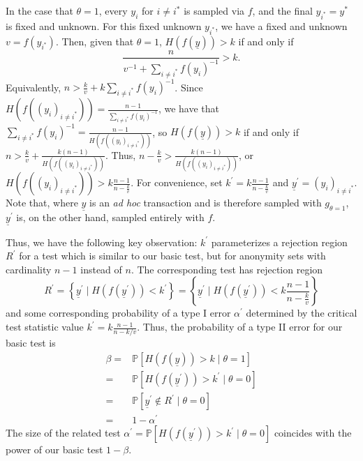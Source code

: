 \documentclass{tran-l}
\theoremstyle{cor}
\theoremstyle{definition}
\theoremstyle{remark}
\theoremstyle{conjecture}
\numberwithin{equation}{section}
\begin{document}
In the case that $\theta = 1$, every $y_i$ for $i \neq i^*$ is sampled via $f$, and the final $y_{i^*} = y^*$ is fixed and unknown. For this fixed unknown $y_{i^*}$, we have a fixed and unknown $v = f(y_{i^*})$. Then, given that $\theta=1$, $H(f(\underline{y})) > k$ if and only if \[\frac{n}{v^{-1} + \sum_{i \neq i^*} f(y_i)^{-1}} > k.\]
Equivalently, $n > \frac{k}{v} + k \sum_{i \neq i^*} f(y_i)^{-1}$.
Since $H(f((y_i)_{i \neq i^*})) = \frac{n-1}{\sum_{i \neq i^*} f(y_i)^{-1}}$, we have that $\sum_{i \neq i^*} f(y_i)^{-1} = \frac{n-1}{H(f((y_i)_{i \neq i^*}))}$, so $H(f(\underline{y})) > k$ if and only if $n > \frac{k}{v} + \frac{k(n-1)}{H(f((y_i)_{i \neq i^*}))}$.
Thus, $n - \frac{k}{v} > \frac{k(n-1)}{H(f((y_i)_{i \neq i^*}))}$, or $H(f((y_i)_{i \neq i^*})) > k\frac{n-1}{n - \frac{k}{v}}$.
For convenience, set $k^\prime = k\frac{n-1}{n - \frac{k}{v}}$ and $\underline{y}^\prime = (y_i)_{i \neq i^*}$.
Note that, where $\underline{y}$ is an \textit{ad hoc} transaction and is therefore sampled with $g_{\theta=1}$, $\underline{y}^\prime$ is, on the other hand, sampled entirely with $f$.

Thus, we have the following key observation: $k^\prime$ parameterizes a rejection region $R^\prime$ for a test which is similar to our basic test, but for anonymity sets with cardinality $n-1$ instead of $n$.
The corresponding test has rejection region \[R^\prime = \left\{\underline{y}^\prime \mid H(f(\underline{y}^\prime)) < k^\prime\right\} = \left\{\underline{y}^\prime \mid H(f(\underline{y}^\prime)) < k\frac{n-1}{n - \frac{k}{v}}\right\}\] and some corresponding probability of a type I error $\alpha^\prime$ determined by the critical test statistic value $k^\prime = k\frac{n-1}{n - k/v}$.
Thus, the probability of a type II error for our basic test is
\begin{align}
\beta =& \mathbb{P}\left[H(f(\underline{y})) > k \mid \theta = 1\right] \\
=& \mathbb{P}\left[H(f(\underline{y}^\prime)) > k^\prime \mid \theta = 0\right]\\
=& \mathbb{P}\left[\underline{y}^\prime \notin R^\prime \mid \theta = 0\right]\\
=& 1 - \alpha^\prime
\end{align}
The size of the related test $\alpha^\prime = \mathbb{P}\left[H(f(\underline{y}^\prime)) > k^\prime \mid \theta = 0\right]$ coincides with the power of our basic test $1-\beta$.
\end{document}
